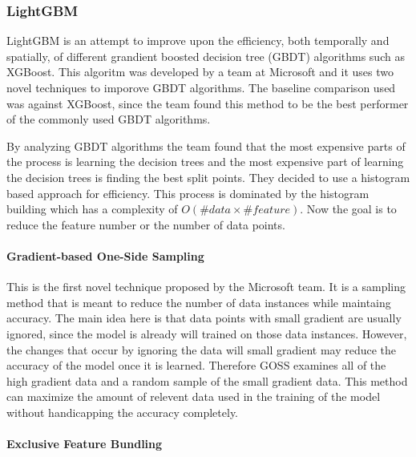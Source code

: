 \documentclass[11pt]{article}
\begin{document}
    \hypertarget{lightgbm}{%
\subsubsection{LightGBM}\label{lightgbm}}

LightGBM is an attempt to improve upon the efficiency, both temporally
and spatially, of different grandient boosted decision tree (GBDT)
algorithms such as XGBoost. This algoritm was developed by a team at
Microsoft and it uses two novel techniques to imporove GBDT algorithms.
The baseline comparison used was against XGBoost, since the team found
this method to be the best performer of the commonly used GBDT
algorithms.

By analyzing GBDT algorithms the team found that the most expensive
parts of the process is learning the decision trees and the most
expensive part of learning the decision trees is finding the best split
points. They decided to use a histogram based approach for efficiency.
This process is dominated by the histogram building which has a
complexity of \(O(\#data \times \#feature)\). Now the goal is to reduce
the feature number or the number of data points.

\hypertarget{gradient-based-one-side-sampling}{%
\paragraph{Gradient-based One-Side
Sampling}\label{gradient-based-one-side-sampling}}

This is the first novel technique proposed by the Microsoft team. It is
a sampling method that is meant to reduce the number of data instances
while maintaing accuracy. The main idea here is that data points with
small gradient are usually ignored, since the model is already will
trained on those data instances. However, the changes that occur by
ignoring the data will small gradient may reduce the accuracy of the
model once it is learned. Therefore GOSS examines all of the high
gradient data and a random sample of the small gradient data. This
method can maximize the amount of relevent data used in the training of
the model without handicapping the accuracy completely.

\hypertarget{exclusive-feature-bundling}{%
\paragraph{Exclusive Feature
Bundling}\label{exclusive-feature-bundling}}
\end{document}

